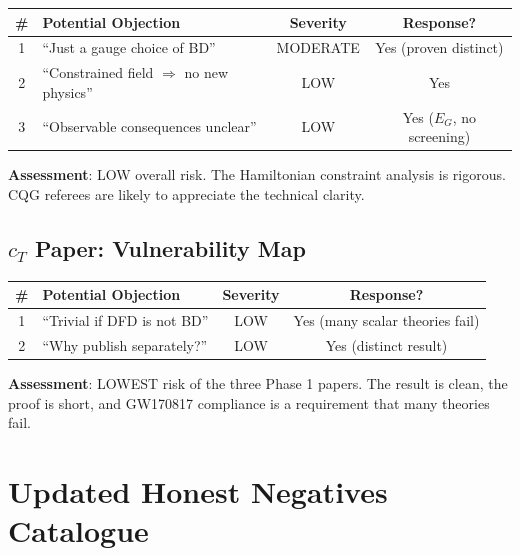 \documentclass[11pt,a4paper]{article}
\begin{document}
\begin{center}
\begin{tabular}{clcc}
\toprule
\textbf{\#} & \textbf{Potential Objection} & \textbf{Severity} & \textbf{Response?} \\
\midrule
1 & ``Just a gauge choice of BD'' & MODERATE & Yes (proven distinct) \\
2 & ``Constrained field $\Rightarrow$ no new physics'' & LOW & Yes \\
3 & ``Observable consequences unclear'' & LOW & Yes ($E_G$, no screening) \\
\bottomrule
\end{tabular}
\end{center}

\textbf{Assessment}: LOW overall risk. The Hamiltonian constraint analysis is rigorous. CQG referees are likely to appreciate the technical clarity.

\subsection{$c_T$ Paper: Vulnerability Map}

\begin{center}
\begin{tabular}{clcc}
\toprule
\textbf{\#} & \textbf{Potential Objection} & \textbf{Severity} & \textbf{Response?} \\
\midrule
1 & ``Trivial if DFD is not BD'' & LOW & Yes (many scalar theories fail) \\
2 & ``Why publish separately?'' & LOW & Yes (distinct result) \\
\bottomrule
\end{tabular}
\end{center}

\textbf{Assessment}: LOWEST risk of the three Phase 1 papers. The result is clean, the proof is short, and GW170817 compliance is a requirement that many theories fail.

\section{Updated Honest Negatives Catalogue}
\end{document}
